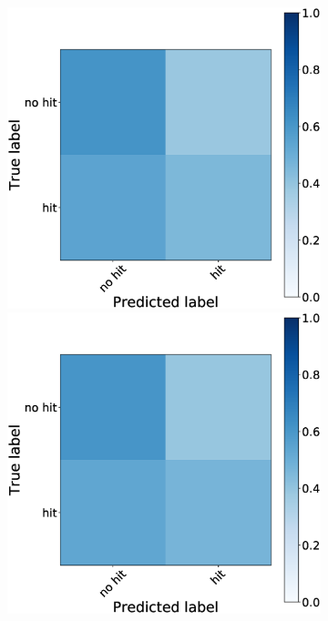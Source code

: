 \documentclass[journal]{IEEEtran}
\begin{document}
{{\begin{figure}[h!]
\begin{subfigure}{0.5\textwidth}
\includegraphics[scale=0.14]{revisedimages/matrix_5.eps}
\includegraphics[scale=0.14]{revisedimages/matrix_6.eps}\\

\end{subfigure}
\end{figure}}}
\end{document}
